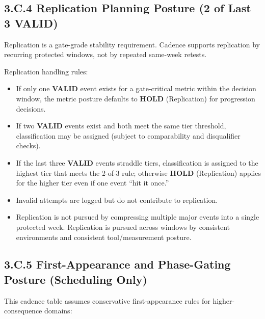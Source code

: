 \documentclass[10pt]{article}
\begin{document}
\subsection*{3.C.4 Replication Planning Posture (2 of Last 3 \textbf{VALID})}
{}

Replication is a gate-grade stability requirement. Cadence supports replication by recurring protected windows, not by repeated same-week retests.

Replication handling rules:

\begin{itemize}
\item If only one \textbf{VALID} event exists for a gate-critical metric within the decision window, the metric posture defaults to \textbf{HOLD} (Replication) for progression decisions.
\item If two \textbf{VALID} events exist and both meet the same tier threshold, classification may be assigned (subject to comparability and disqualifier checks).
\item If the last three \textbf{VALID} events straddle tiers, classification is assigned to the highest tier that meets the 2-of-3 rule; otherwise \textbf{HOLD} (Replication) applies for the higher tier even if one event “hit it once.”
\item Invalid attempts are logged but do not contribute to replication.
\item Replication is not pursued by compressing multiple major events into a single protected week. Replication is pursued across windows by consistent environments and consistent tool/measurement posture.
\end{itemize}

\subsection*{3.C.5 First-Appearance and Phase-Gating Posture (Scheduling Only)}
{}

This cadence table assumes conservative first-appearance rules for higher-consequence domains:
\end{document}
